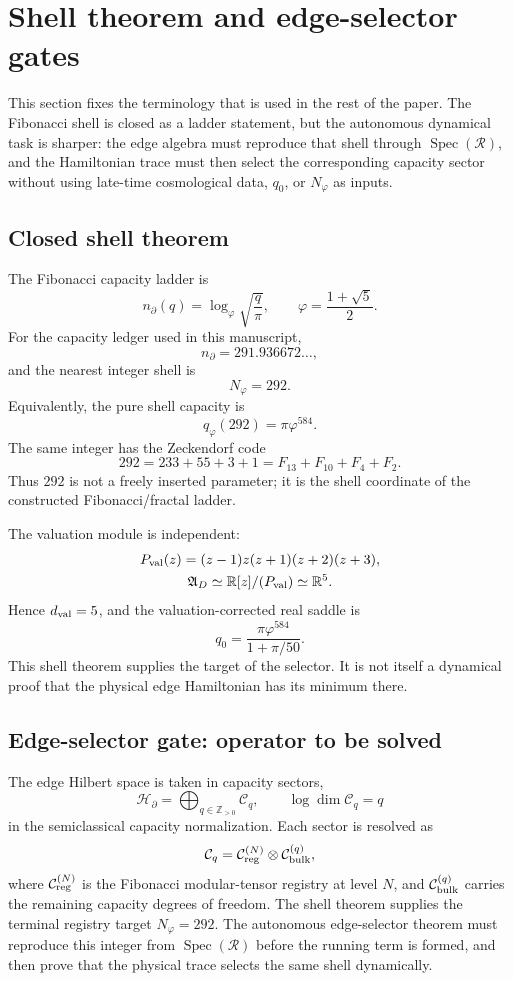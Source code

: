 \documentclass[aps,prd,reprint,nofootinbib,superscriptaddress,floatfix]{revtex4-2}
\numberwithin{equation}{section}
\theoremstyle{definition}
\theoremstyle{plain}
\begin{document}
\section{Shell theorem and edge-selector gates}
\label{sec:edge-theorem-gates}

This section fixes the terminology that is used in the rest of the paper.  The
Fibonacci shell is closed as a ladder statement, but the autonomous dynamical
task is sharper: the edge algebra must reproduce that shell through
\(\operatorname{Spec}(\mathcal R)\), and the Hamiltonian trace must then select
the corresponding capacity sector without using late-time cosmological data,
\(q_0\), or \(N_\varphi\) as inputs.

\subsection{Closed shell theorem}

The Fibonacci capacity ladder is
\[
n_\partial(q)=\log_\varphi\sqrt{\frac q\pi},
\qquad
\varphi=\frac{1+\sqrt5}{2}.
\]
For the capacity ledger used in this manuscript,
\[
n_\partial=291.936672\ldots,
\]
and the nearest integer shell is
\[
\boxed{N_\varphi=292.}
\]
Equivalently, the pure shell capacity is
\[
q_\varphi(292)=\pi\varphi^{584}.
\]
The same integer has the Zeckendorf code
\[
292=233+55+3+1=F_{13}+F_{10}+F_4+F_2.
\]
Thus \(292\) is not a freely inserted parameter; it is the shell coordinate of
the constructed Fibonacci/fractal ladder.

The valuation module is independent:
\[
\begin{gathered}
P_{\rm val}(z)=(z-1)z(z+1)(z+2)(z+3),\\
\mathfrak A_D\simeq\mathbb R[z]/(P_{\rm val})\simeq\mathbb R^5.
\end{gathered}
\]
Hence \(d_{\rm val}=5\), and the valuation-corrected real saddle is
\[
\boxed{
q_0=
\frac{\pi\varphi^{584}}{1+\pi/50}.
}
\]
This shell theorem supplies the target of the selector.  It is not itself a
dynamical proof that the physical edge Hamiltonian has its minimum there.

\subsection{Edge-selector gate: operator to be solved}

The edge Hilbert space is taken in capacity sectors,
\[
\mathcal H_\partial
=
\bigoplus_{q\in\mathbb Z_{>0}}\mathcal C_q,
\qquad
\log\dim\mathcal C_q=q
\]
in the semiclassical capacity normalization.  Each sector is resolved as
\[
\mathcal C_q
=
\mathcal C_{\rm reg}^{(N)}
\otimes
\mathcal C_{\rm bulk}^{(q)} ,
\]
where \(\mathcal C_{\rm reg}^{(N)}\) is the Fibonacci modular-tensor registry
at level \(N\), and \(\mathcal C_{\rm bulk}^{(q)}\) carries the remaining
capacity degrees of freedom.  The shell theorem supplies the terminal registry target
\(N_\varphi=292\).  The autonomous edge-selector theorem must reproduce this
integer from \(\operatorname{Spec}(\mathcal R)\) before the running term is
formed, and then prove that the physical trace selects the same shell
dynamically.
\end{document}
